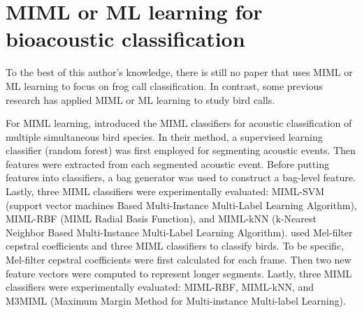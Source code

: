 \section{MIML or ML learning for bioacoustic classification}
To the best of this author's knowledge, there is still no paper that uses MIML or ML learning to focus on frog call classification. In contrast, some previous research has applied MIML or ML learning to study bird calls.

For MIML learning, \citep{briggs2012acoustic} introduced the MIML classifiers for acoustic classification of multiple simultaneous bird species. In their method, a supervised learning classifier (random forest) was first employed for segmenting acoustic events. Then features were extracted from each segmented acoustic event. Before putting features into classifiers, a bag generator was used to construct a bag-level feature. Lastly, three MIML classifiers were experimentally evaluated: MIML-SVM (support vector machines Based Multi-Instance Multi-Label Learning Algorithm), MIML-RBF (MIML Radial Basis Function), and MIML-kNN (k-Nearest Neighbor Based Multi-Instance Multi-Label Learning Algorithm).
\citep{dufour2013multi} used Mel-filter cepstral coefficients and three MIML classifiers to classify birds. To be specific, Mel-filter cepstral coefficients were first calculated for each frame. Then two new feature vectors were computed to represent longer segments.
Lastly, three MIML classifiers were experimentally evaluated: MIML-RBF, MIML-kNN, and M3MIML (Maximum Margin Method for Multi-instance Multi-label Learning). 

